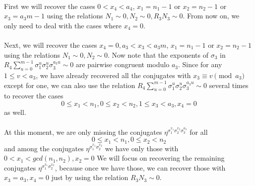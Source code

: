 \paragraph*{}
First we will recover the cases $0<x_4<a_4$, $x_1=n_1-1$ or $x_2=n_2-1$ or $x_3=a_3m-1$ using the relations $N_1\sim 0, N_2\sim 0, R_3N_3\sim 0$. From now on, we only need to deal with the cases where $x_4=0$.
\paragraph*{}
Next, we will recover the cases $x_4=0, a_3< x_3<a_3m$, $x_1=n_1-1$ or $x_2=n_2-1$ using the relations $N_1\sim 0, N_2\sim 0$. Now note that the exponents of $\sigma_3$ in $R_4\sum_{u=0}^{m-1}\sigma_1^{u}\sigma_2^{u}\sigma_3^{a_3u}\sim 0$ are pairwise congruent modulo $a_3$. Since for any $1\leq v<a_3$, we have already recovered all the conjugates with $x_3\equiv v \pmod{a_3}$ except for one, we can also use the relation $R_4\sum_{u=0}^{m-1}\sigma_1^{u}\sigma_2^{u}\sigma_3^{a_3u}\sim 0$ several times to recover the cases $$0\leq x_1<n_1, 0\leq x_2< n_2, 1\leq x_3<a_3, x_4=0$$ as well.
\paragraph*{}
At this moment, we are only missing the conjugates $\eta^{\sigma_1^{x_1}\sigma_2^{x_2}\sigma_3^{a_3}}$ for all $$0\leq x_1<n_1, 0\leq x_2<n_2$$ 
and among the conjugates $\eta^{\sigma_1^{x_1}\sigma_2^{x_2}}$
we have only those with 
$0 < x_1 <gcd(n_1,n_2),  x_2 = 0$
We will focus on recovering the remaining conjugates $\eta^{\sigma_1^{x_1}\sigma_2^{x_2}}$, 
because once we have those, we can recover those with $x_3=a_3,x_4=0$ just by using the relation $R_3N_3\sim 0$.

